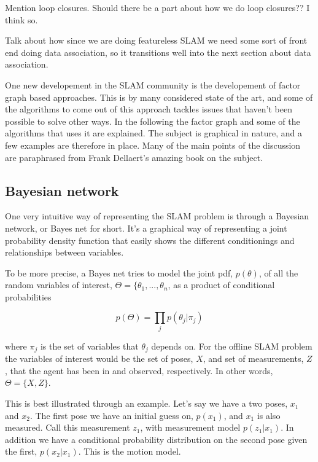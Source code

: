 Mention loop closures. Should there be a part about how we do loop closures?? I think so. 

Talk about how since we are doing featureless SLAM we need some sort of front end doing data association, so it transitions well into the next section about data association.

One new developement in the SLAM community is the developement of factor graph based approaches. This is by many considered state of the art, and some of the algorithms to come out of this approach tackles issues that haven't been possible to solve other ways. In the following the factor graph and some of the algorithms that uses it are explained. The subject is graphical in nature, and a few examples are therefore in place. Many of the main points of the discussion are paraphrased from Frank Dellaert's amazing book on the subject\cite{Dellaert}. 

\subsection{Bayesian network}

One very intuitive way of representing the SLAM problem is through a Bayesian network, or Bayes net for short. It's a graphical way of representing a joint probability density function that easily shows the different conditionings and relationships between variables. 

To be more precise, a Bayes net tries to model the joint pdf, $p(\theta)$, of all the random variables of interest, $\Theta = \{\theta_1, ..., \theta_n$, as a product of conditional probabilities

\begin{equation}
    p(\Theta) = \prod_j p(\theta_j|\pi_j)
\end{equation}

where $\pi_j$ is the set of variables that $\theta_j$ depends on. For the offline SLAM problem the variables of interest would be the set of poses, $X$, and set of measurements, $Z$, that the agent has been in and observed, respectively. In other words, $\Theta = \{X,Z\}$. 

This is best illustrated through an example. Let's say we have a two poses, $x_1$ and $x_2$. The first pose we have an initial guess on, $p(x_1)$, and $x_1$ is also measured. Call this measurement $z_1$, with measurement model $p(z_1|x_1)$. In addition we have a conditional probability distribution on the second pose given the first, $p(x_2|x_1)$. This is the motion model. 

